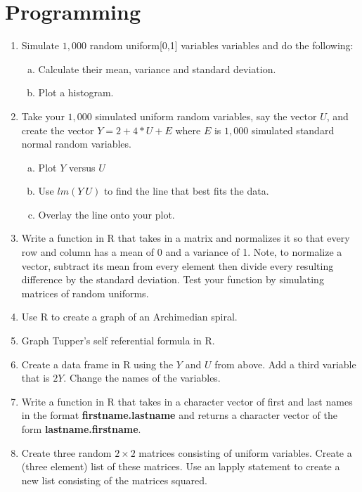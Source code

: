 \documentclass[12pt]{article}
\begin{document}
\section{Programming}
\begin{enumerate}[1.]
\item Simulate $1,000$ random uniform[0,1] variables
  variables and do the following:
  \begin{enumerate}[a.]
  \item Calculate their mean, variance and standard deviation.
  \item Plot a histogram.
  \end{enumerate}
\item Take your $1,000$ simulated uniform random variables, say the
  vector $U$, and create the vector $Y = 2 + 4 * U + E$ where $E$ is
  $1,000$ simulated standard normal random variables.
  \begin{enumerate}[a.]
  \item Plot $Y$ versus $U$
  \item Use $lm(Y ~ U)$ to find the line that best fits the data.
  \item Overlay the line onto your plot.
  \end{enumerate}
\item Write a function in R that takes in a matrix and normalizes it so that
  every row and column has a mean of 0 and a variance of 1. Note, to normalize
  a vector, subtract its mean from every element then divide every resulting difference
  by the standard deviation. Test your function by simulating matrices of random uniforms.
\item Use R to create a graph of an Archimedian spiral.
\item Graph Tupper's self referential formula in R.
\item Create a data frame in R using the $Y$ and $U$ from above. Add a third variable
  that is $2Y$. Change the names of the variables. 
\item Write a function in R that takes in a character vector of first and last names
  in the format {\bf firstname.lastname} and returns a character vector of the form
{\bf lastname.firstname}.
\item Create three random $2\times 2$ matrices consisting of uniform variables. 
  Create a (three element) list of these matrices. Use an lapply statement to create
  a new list consisting of the matrices squared.
\end{enumerate}
\end{document}
